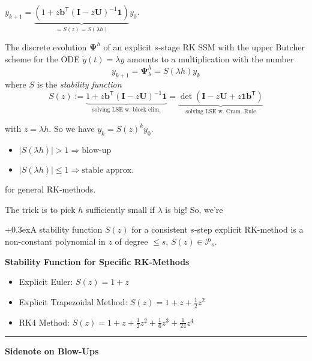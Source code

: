 \documentclass[a4paper,11pt]{extarticle}
\newcommand{\cP}{\mathcal{P}}
\newcommand{\abs}[1]{\left\lvert #1 \right\rvert}
\newcommand*{\T}{\mathsf{T}}
\newcommand{\mat}[1]{\mathbf{#1}}
\renewcommand{\vec}[1]{\mathbf{#1}}
\newcommand{\vb}{\vec{b}}
\newcommand{\MI}{\mat{I}}
\newcommand{\MU}{\mat{U}}
\newcommand{\MPsi}{\mat{\Psi}}
\newcommand{\emptyarg}[1][]{\ifthenelse{\isempty{#1}}{}{\ (#1)}}
\newcommand{\Cor}[1][]{\colorbox{thmcolor}{%
\color{custtitlecolor}{\textbf{C.\emptyarg[#1]}}}\kern+0.3ex}
\newcommand{\sep}{\vspace{5pt}\noindent\hrule\vspace{5pt}}
\begin{document}
\begin{multicols*}{2}
$
y_{k+1}=\underbrace{(1+z\vb^\T(\MI-z\MU)^{-1}\vec{1})}_{=S(z)=S(\lambda h)}y_0
$.

The discrete evolution $\MPsi^h$ of an explicit $s$-stage RK SSM with the upper
Butcher scheme for the ODE $\dot{y}(t)=\lambda y$ amounts to a multiplication
with the number
\[
y_{k+1}=\MPsi^h_\lambda=S(\lambda h)y_k
\]
where $S$ is the \emph{stability function}
\[
S(z) := \underbrace{1 + z\vb^\T(\MI-z\MU)^{-1}\vec{1}}_{\text{solving LSE w.
block elim.}} =
\underbrace{\det\left(\MI-z\MU+z\vec{1}\vb^\T\right)}_{\text{solving LSE w.
Cram. Rule}}
\]

with $z=\lambda h$. So we have $y_k=S(z)^{k}y_0$.
\begin{itemize}
  \item $\abs{S(\lambda h)}>1\Longrightarrow\text{blow-up}$
  \item $\abs{S(\lambda h)}\leq 1\Longrightarrow\text{stable approx.}$
\end{itemize}
for general RK-methods.

The trick is to pick $h$ sufficiently small if $\lambda$ is big! So, we're

\Cor A stability function $S(z)$ for a consistent $s$-step explicit RK-method
is a non-constant polynomial in $z$ of degree $\leq s$, $S(z)\in\cP_s$.

\textbf{Stability Function for Specific RK-Methods}

\begin{itemize}
	\item Explicit Euler: $S(z)=1+z$
	\item Explicit Trapezoidal Method: $S(z)=1+z+\frac{1}{2}z^2$
	\item RK4 Method: $S(z)=1+z+\frac{1}{2}z^2+\frac{1}{6}z^3+\frac{1}{24}z^4$
\end{itemize}

\sep

\textbf{Sidenote on Blow-Ups}


\end{multicols*}
\end{document}
